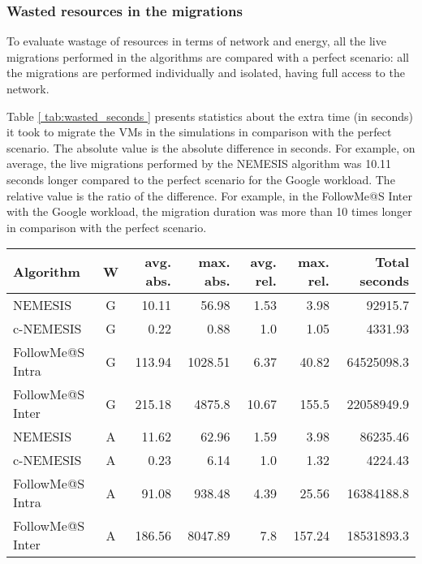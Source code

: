 \subsubsection{Wasted resources in the migrations}

To evaluate wastage of resources in terms of network and energy, all the live migrations performed in the algorithms are compared with a perfect scenario: all the migrations are performed individually and isolated, having full access to the network.

Table \ref{ tab:wasted_seconds } presents statistics about the extra time
(in seconds) it took to migrate the VMs in the simulations in comparison with the perfect scenario. The absolute
value is the absolute difference in seconds. For example, on average,
the live migrations performed by the NEMESIS algorithm was 10.11 seconds longer compared to the perfect scenario for the Google workload. The
relative value is the ratio of the difference. For example, in the
FollowMe@S Inter with the Google workload, the migration duration was
more than 10 times longer in comparison with the perfect scenario.


\begin{table*}[!ht]

\caption{Extra seconds during migrations compared to the case when there is no congestion, where ``W'' stands for ``Workload'', ``G'' for Google and, ``A'' for Azure. ``avg.'' for the average of the observations, ``max.'' for the maximum value, ``abs.'' for the absolute value, and ``rel.'' for the relative value.} \label{ tab:wasted_seconds } \centering
\begin{tabular}{|l|c|r|r|r|r|r|}
  \hline  
  \textbf{Algorithm} & \textbf{W}  & \textbf{avg. abs.} &  \textbf{max. abs.} & \textbf{avg. rel.} &  \textbf{max. rel.} &  \textbf{Total seconds} \\
  
  \hline
  NEMESIS  & G & 10.11  & 56.98 & 1.53 & 3.98  & 92915.7 \\
  \hline
  c-NEMESIS & G & 0.22  & 0.88 & 1.0 & 1.05  & 4331.93 \\
  \hline
  FollowMe@S Intra & G & 113.94  & 1028.51 &  6.37  & 40.82  & 64525098.3 \\
  \hline
  FollowMe@S Inter & G & 215.18  & 4875.8 & 10.67 & 155.5  & 22058949.9\\
  \hline
  NEMESIS  & A & 11.62  & 62.96 & 1.59 & 3.98  & 86235.46 \\
  \hline
  c-NEMESIS & A &  0.23 & 6.14   & 1.0 & 1.32  & 4224.43\\
  \hline
  FollowMe@S Intra & A & 91.08  & 938.48 & 4.39 & 25.56  & 16384188.8  \\
  \hline
  FollowMe@S Inter & A & 186.56  & 8047.89 & 7.8 & 157.24  & 18531893.3 \\
  \hline

\end{tabular}

\end{table*}

